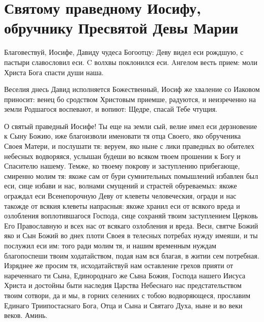 \mychapterending


 
\section{Святому праведному Иосифу, обручнику Пресвятой Девы Марии}\begin{mymulticols}
 


Благовествуй, Иосифе, Давиду чудеса Богоотцу: Деву видел еси рождшую, с пастыри славословил еси. C волхвы поклонился еси. Aнгелом весть прием: моли Христа Бога спасти души наша. 


Веселия днесь Давид исполняется Божественный, Иосиф же хваление со Иаковом приносит: венец бо сродством Христовым приемше, радуются, и неизреченно на земли Родшагося воспевают, и вопиют: Щедре, спасай Тебе чтущия.


 О святый праведный Иосифе! Ты еще на земли сый, велие имел еси дерзновение к Сыну Божию, иже благоизволи именовати тя отца Своего, яко обрученика Своея Матери, и послушати тя: веруем, яко ныне с лики праведных во обителех небесных водворяяся, услышан будеши во всяком твоем прошении к Богу и Спасителю нашему. Темже, ко твоему покрову и заступлению прибегающе, смиренно молим тя: якоже сам от бури сумнительных помышлений избавлен был еси, сице избави и нас, волнами смущений и страстей обуреваемых: якоже ограждал еси Всенепорочную Деву от клеветы человеческия, огради и нас такожде от всякия клеветы напрасныя: якоже хранил еси от всякого вреда и озлобления воплотившагося Господа, сице сохраняй твоим заступлением Церковь Его Православную и всех нас от всякаго озлобления и вреда. Веси, святче Божий яко и Сын Божий во днех плоти Своея в телесных потребах нужду имеяши, и ты послужил еси им: того ради молим тя, и нашим временным нуждам благопоспеши твоим ходатайством, подая нам вся благая, в житии сем потребная. Изряднее же просим тя, исходатайствуй нам оставление грехов прияти от нареченнаго ти Сына, Единороднаго же Сына Божия, Господа нашего Иисуса Христа и достойны быти наследия Царства Небеснаго нас предстательством твоим сотвори, да и мы, в горних селениих с тобою водворяющеся, прославим Единаго Триипостаснаго Бога, Отца и Сына и Святаго Духа, ныне и во веки веков. Аминь.

\end{mymulticols}

